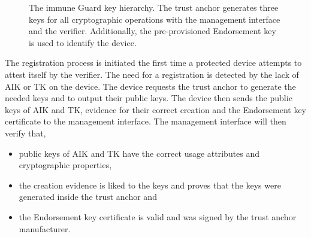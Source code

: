 \documentclass[a4paper,oneside,10pt,extrafontsizes]{memoir}
\begin{document}
\begin{figure}[ht!]
  \centerfloat
  \caption{The immune Guard key hierarchy. The trust anchor
  generates three keys for all cryptographic operations with the management
interface and the verifier. Additionally, the pre-provisioned Endorsement key is
used to identify the device.}
  \label{fig:hierarchy}
\end{figure}

The registration process is initiated the first time a protected device
attempts to attest itself by the verifier. The need for a registration is
detected by the lack of AIK or TK on the device. The device requests the trust
anchor to generate the needed keys and to output their public keys. The device
then sends the public keys of AIK and TK, evidence for their correct creation
and the Endorsement key certificate to the management interface. The management
interface will then verify that,

\begin{itemize}
  \item public keys of AIK and TK have the correct usage attributes and
    cryptographic properties,
  \item the creation evidence is liked to the keys and proves that the keys
    were generated inside the trust anchor and
  \item the Endorsement key certificate is valid and was signed by the trust
    anchor manufacturer.
\end{itemize}
\end{document}
